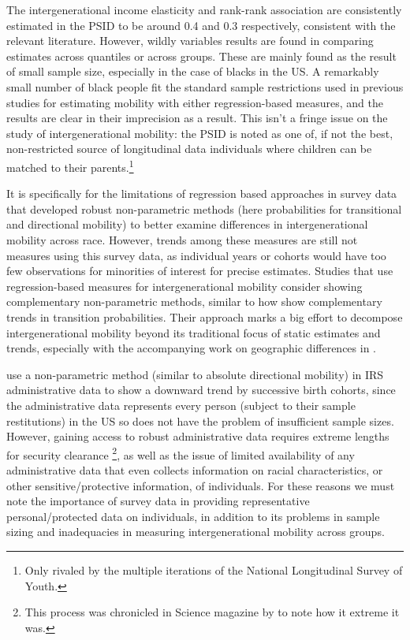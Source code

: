 \documentclass[notitlepage,12pt]{article}
\begin{document}
The intergenerational income elasticity and rank-rank association are consistently estimated in the PSID to be around 0.4 and 0.3 respectively, consistent with the relevant literature.  However, wildly variables results are found in comparing estimates across quantiles or across groups.  These are mainly found as the result of small sample size, especially in the case of blacks in the US.  A remarkably small number of black people fit the standard sample restrictions used in previous studies for estimating mobility with either regression-based measures, and the results are clear in their imprecision as a result.  This isn't a fringe issue on the study of intergenerational mobility: the PSID is noted as one of, if not the best, non-restricted source of longitudinal data individuals where children can be matched to their parents.\footnote{Only rivaled by the multiple iterations of the National Longitudinal Survey of Youth.}

It is specifically for the limitations of regression based approaches in survey data that \cite{bhattacharya2011nonparametric} developed robust non-parametric methods (here probabilities for transitional and directional mobility) to better examine differences in intergenerational mobility across race.  However, trends among these measures are still not measures using this survey data, as individual years or cohorts would have too few observations for minorities of interest for precise estimates.  Studies that use regression-based measures for intergenerational mobility consider showing complementary non-parametric methods, similar to how \cite{chetty2014united} show complementary trends in transition probabilities.  Their approach marks a big effort to decompose intergenerational mobility beyond its traditional focus of static estimates and trends, especially with the accompanying work on geographic differences in \cite{chetty2014land}.

\cite{chetty2017fading} use a non-parametric method (similar to absolute directional mobility) in IRS administrative data to show a downward trend by successive birth cohorts, since the administrative data represents every person (subject to their sample restitutions) in the US so does not have the problem of insufficient sample sizes.  However, gaining access to robust administrative data requires extreme lengths for security clearance \footnote{This process was chronicled in Science magazine by \cite{jeffrey} to note how it extreme it was.}, as well as the issue of limited availability of any administrative data that even collects information on racial characteristics, or other sensitive/protective information, of individuals.  For these reasons we must note the importance of survey data in providing representative personal/protected data on individuals, in addition to its problems in sample sizing and inadequacies in measuring intergenerational mobility across groups.
\end{document}
